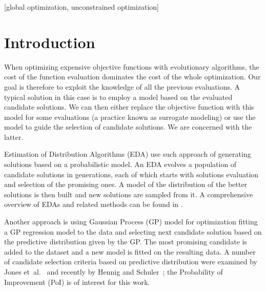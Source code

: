 \documentclass{sig-alt-release2}
\begin{document}
\maketitle
\begin{abstract}
Model Guided Sampling Optimization (MGSO) is a novel expensive black-box
optimization method based on a combination of ideas from Estimation of 
Distribution Algorithms and global optimization methods using Gaussian 
Processes. The algorithm is described and its implementation tested on 
three benchmark functions as a proof of concept.
\end{abstract}

[global optimization,
unconstrained optimization]


\section{Introduction}

When optimizing expensive objective functions with evolutionary algorithms, the cost of the function 
evaluation dominates the cost of the whole optimization. Our goal is therefore to exploit the knowledge 
of all the previous evaluations. A typical solution in this case is to employ a model based on the evaluated 
candidate solutions. We can then either replace the objective function  with this model for some 
evaluations (a practice known as surrogate modeling) or use the model to guide the selection of candidate 
solutions. We are concerned with the latter.

Estimation of Distribution Algorithms (EDA) use such approach of generating solutions based on a probabilistic model. An EDA evolves a population of 
candidate solutions in generations, each of which starts with solutions evaluation and selection of the
promising ones. A model of the distribution of the better solutions is then built and new 
solutions are sampled from it. A comprehensive overview of EDAs and related methods can be found in \cite{pelikan2006scalable}.

Another approach is using Gaussian Process (GP) model for optimization fitting a GP regression model to the 
data and selecting next candidate solution based on the predictive distribution given by the GP. The most 
promising candidate is added to the dataset and a new model is fitted on the resulting data. A number of candidate 
selection criteria based on predictive distribution were examined by Jones et~al.~\cite{jones01taxonomy} 
and recently by Hennig and Schuler~\cite{hennig12entropy}; the Probability of Improvement (PoI) is of interest for this work.
\end{document}
